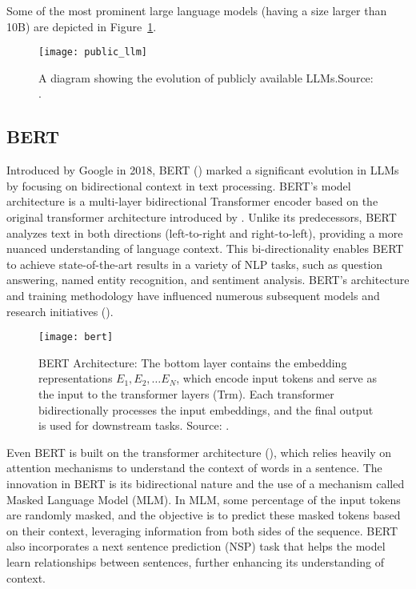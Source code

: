 Some of the most prominent large language models (having a size larger than 10B) are depicted in Figure~\ref{fig:llm-evolution}.

\begin{figure}[h!]
	\centering
	\texttt{[image: public\_llm]}
	\caption{A diagram showing the evolution of publicly available LLMs.Source: \protect\textcite{survey}.}
	\label{fig:llm-evolution}
\end{figure}

\subsection{BERT}
\label{subsec:bert}

Introduced by Google in 2018, BERT (\textcite{devlin2019bert}) marked a significant evolution in LLMs by focusing on bidirectional context in text processing.
BERT’s model architecture is a multi-layer bidirectional Transformer encoder based on the original transformer architecture introduced by \textcite{vaswani2023attention}.
Unlike its predecessors, BERT analyzes text in both directions (left-to-right and right-to-left), providing a more nuanced understanding of language context.
This bi-directionality enables BERT to achieve state-of-the-art results in a variety of NLP tasks, such as question answering, named entity recognition, and sentiment analysis.
BERT's architecture and training methodology have influenced numerous subsequent models and research initiatives (\textcite{devlin2019bert}).

\begin{figure}[h!]
	\centering
	\texttt{[image: bert]}
	\caption{BERT Architecture: The bottom layer contains the embedding representations \(E_1, E_2, \ldots E_N\), which encode input tokens and serve as the input to the transformer layers (Trm).
		Each transformer bidirectionally processes the input embeddings, and the final output is used for downstream tasks. Source: \protect\textcite{devlin2019bert}.}
	\label{fig:bert-arch}
\end{figure}

Even BERT is built on the transformer architecture (\textcite{vaswani2023attention}), which relies heavily on attention mechanisms to understand the context of words in a sentence.
The innovation in BERT is its bidirectional nature and the use of a mechanism called Masked Language Model (MLM). In MLM, some percentage of the input tokens are randomly masked, and the objective is to predict these masked tokens based on their context, leveraging information from both sides of the sequence.
BERT also incorporates a next sentence prediction (NSP) task that helps the model learn relationships between sentences, further enhancing its understanding of context.

